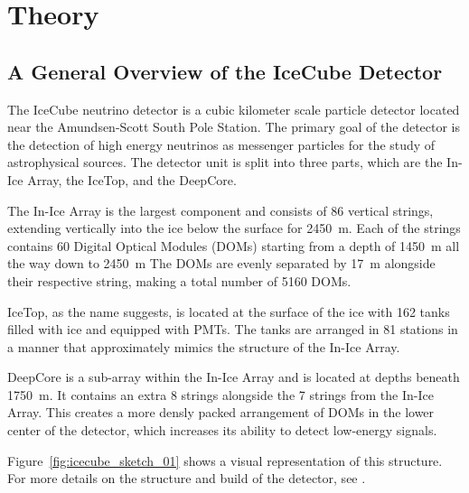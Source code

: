 \chapter{Theory}

\section{A General Overview of the IceCube Detector}
The IceCube neutrino detector is a cubic kilometer scale particle detector located near the Amundsen-Scott South Pole Station. The primary goal of 
the detector is the detection of high energy neutrinos as messenger particles for the study of astrophysical sources. The detector unit is split into three 
parts, which are the In-Ice Array, the IceTop, and the DeepCore. 

The In-Ice Array is the largest component and consists of 86 vertical strings, extending vertically into the ice below the surface for \SI{2450}{\metre}. 
Each of the strings contains 60 Digital Optical Modules (DOMs) starting from a depth of \SI{1450}{\metre} all the way down to \SI{2450}{\metre}
The DOMs are evenly separated by \SI{17}{\metre} alongside their respective string, making a total number of \num{5160} DOMs. 

IceTop, as the name suggests, is located at the surface of the ice with \num{162} tanks filled with ice and equipped with PMTs. 
The tanks are arranged in 81 stations in a manner that approximately mimics the structure of the In-Ice Array. 

DeepCore is a sub-array within the In-Ice Array and is located at depths beneath \SI{1750}{\metre}. It contains an extra \num{8} strings alongside the 
\num{7} strings from the In-Ice Array. This creates a more densly packed arrangement of DOMs in the lower center of the detector, which increases its 
ability to detect low-energy signals.

Figure~\ref{fig:icecube_sketch_01} shows a visual representation of this structure. For more details on the structure and build of the detector, see \cite{einstein}.

